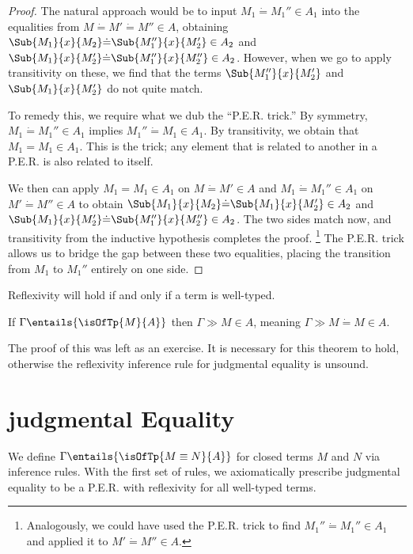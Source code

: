 \documentclass[letterpaper]{article}
\begin{document}
\begin{proof}
The natural approach would be to input $M_1 \dot{=} M_1'' \in A_1$ into the equalities from $M \dot{=} M' \dot{=} M'' \in A$, obtaining
$\Sub{M_1}{x}{M_2} \dot{=} \Sub{M_1''}{x}{M_2'} \in A_2$ and \\
$\Sub{M_1}{x}{M_2'} \dot{=} \Sub{M_1''}{x}{M_2''} \in A_2$. However, when we go to apply
transitivity on these, we find that the terms $\Sub{M_1''}{x}{M_2'}$ and $\Sub{M_1}{x}{M_2'}$ do not quite match.

To remedy this, we require what we dub the ``P.E.R. trick.'' By symmetry, $M_1 \dot{=} M_1'' \in A_1$ implies $M_1'' \dot{=} M_1 \in A_1$.
By transitivity, we obtain that $M_1 = M_1 \in A_1$. This is the trick; any element that is related to another in a P.E.R. is also related to itself.

We then can apply $M_1 = M_1 \in A_1$ on $M \dot{=} M' \in A$ and $M_1 \dot{=} M_1'' \in A_1$ on $M' \dot{=} M'' \in A$ to obtain
$\Sub{M_1}{x}{M_2} \dot{=} \Sub{M_1}{x}{M_2'} \in A_2$ and $\Sub{M_1}{x}{M_2'} \dot{=} \Sub{M_1''}{x}{M_2''} \in A_2$. The two sides match now,
and transitivity from the inductive hypothesis completes the proof.
\footnote{Analogously, we could have used the P.E.R. trick to find $M_1'' \dot{=} M_1'' \in A_1$ and applied it to $M' \dot{=} M'' \in A$.}
The P.E.R. trick allows us to bridge the gap between these two equalities, placing the transition from $M_1$ to $M_1''$ entirely on one side.

\end{proof}

Reflexivity will hold if and only if a term is well-typed.

\begin{theorem}[Reflexivity]
    If $\Gamma \entails{\isOfTp{M}{A}}$ then $\Gamma \gg M \in A$, meaning $\Gamma \gg M \dot{=} M \in A$.
\end{theorem}
The proof of this was left as an exercise. It is necessary for this theorem to hold, otherwise the reflexivity inference rule for judgmental equality is unsound.

\section{judgmental Equality}\label{sec:jeq}

We define $\Gamma \entails{\isOfTp{M \equiv N}{A}}$ for closed terms $M$ and $N$ via inference rules.
With the first set of rules, we axiomatically prescribe judgmental equality to be a P.E.R. with reflexivity
for all well-typed terms.
\end{document}
